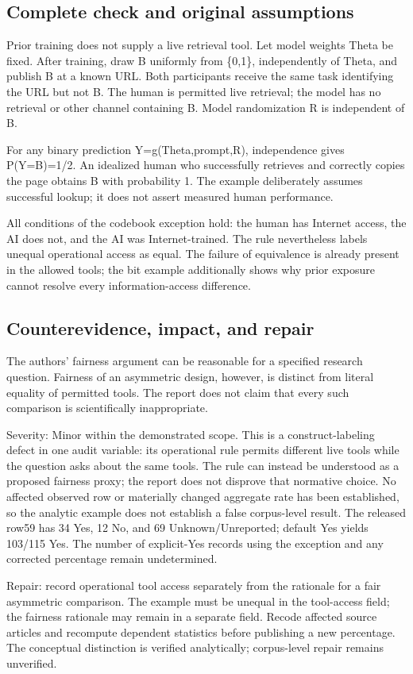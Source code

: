 \documentclass[10pt]{article}
\begin{document}
\subsection*{Complete check and original assumptions}
Prior training does not supply a live retrieval tool. Let model weights Theta be fixed. After training, draw B uniformly from \{0,1\}, independently of Theta, and publish B at a known URL. Both participants receive the same task identifying the URL but not B. The human is permitted live retrieval; the model has no retrieval or other channel containing B. Model randomization R is independent of B.\par
For any binary prediction Y=g(Theta,prompt,R), independence gives P(Y=B)=1/2. An idealized human who successfully retrieves and correctly copies the page obtains B with probability 1. The example deliberately assumes successful lookup; it does not assert measured human performance.\par
All conditions of the codebook exception hold: the human has Internet access, the AI does not, and the AI was Internet-trained. The rule nevertheless labels unequal operational access as equal. The failure of equivalence is already present in the allowed tools; the bit example additionally shows why prior exposure cannot resolve every information-access difference.\par
\subsection*{Counterevidence, impact, and repair}
The authors’ fairness argument can be reasonable for a specified research question. Fairness of an asymmetric design, however, is distinct from literal equality of permitted tools. The report does not claim that every such comparison is scientifically inappropriate.\par
Severity: Minor within the demonstrated scope. This is a construct-labeling defect in one audit variable: its operational rule permits different live tools while the question asks about the same tools. The rule can instead be understood as a proposed fairness proxy; the report does not disprove that normative choice. No affected observed row or materially changed aggregate rate has been established, so the analytic example does not establish a false corpus-level result. The released row59 has 34 Yes, 12 No, and 69 Unknown/Unreported; default Yes yields 103/115 Yes. The number of explicit-Yes records using the exception and any corrected percentage remain undetermined.\par
Repair: record operational tool access separately from the rationale for a fair asymmetric comparison. The example must be unequal in the tool-access field; the fairness rationale may remain in a separate field. Recode affected source articles and recompute dependent statistics before publishing a new percentage. The conceptual distinction is verified analytically; corpus-level repair remains unverified.\par
\end{document}
